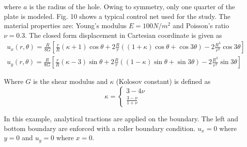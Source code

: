 where $a$ is the radius of the hole.
Owing to symmetry, only one quarter of the plate is modeled.
Fig. 10 shows a typical control net used for the study.
The material properties are: Young’s modulus $E = 100 N/m^2$ and Poisson’s ratio $\nu = 0.3$.
The closed form displacement in Cartesian coordinate is given as
    \begin{subequations}
        \begin{align}
            u_x(r,\theta) = \frac{R}{8G} \left[
                \frac{r}{R} (\kappa + 1) \cos\theta +
                2 \frac{R}{r} \left(
                    (1+ \kappa ) \cos\theta +
                    \cos3\theta
                \right) -
                2 \frac{R^3}{r^3}\cos3\theta
            \right] \\
            u_y(r,\theta) = \frac{R}{8G} \left[
                \frac{r}{R} (\kappa -3) \sin\theta +
                2 \frac{R}{r} \left(
                    (1 - \kappa) \sin\theta +
                    \sin3\theta
                \right) -
                2 \frac{R^3}{r^3}\sin3\theta
            \right]
        \end{align}
    \end{subequations}

Where $G$ is the shear modulus and $\kappa$ (Kolosov constant) is defined as
    \begin{equation}
        \kappa = \left\{
            \begin{aligned}   
                3-4 \nu \\
                \frac{3- \nu }{1+ \nu }    
            \end{aligned}
        \right.
    \end{equation}

In this example, analytical tractions are applied on the boundary.
The left and bottom boundary are enforced with a roller boundary condition. $u_x=0$ where $y=0$
    and $u_y=0$ where $x=0$.

